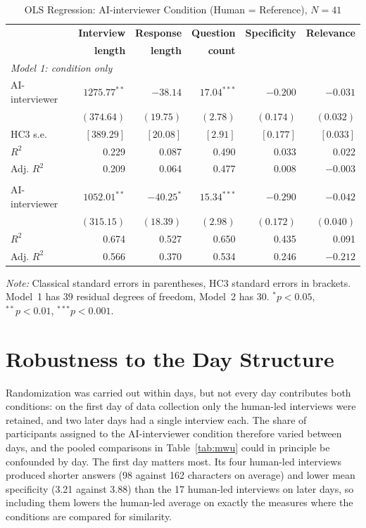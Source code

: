 \documentclass[12pt]{article}
\newcommand{\AII}{AI-interviewer}
\begin{document}
\begin{table}[H]
\centering
\caption{OLS Regression: \AII{} Condition (Human = Reference), $N = 41$}
\label{tab:reg}
\begin{tabularx}{\textwidth}{Xrrrrr}
\toprule
 & \textbf{Interview} & \textbf{Response} & \textbf{Question} &
   \textbf{Specificity} & \textbf{Relevance} \\
 & \textbf{length} & \textbf{length} & \textbf{count} & & \\
\midrule
\multicolumn{6}{l}{\textit{Model 1: condition only}} \\
\quad \AII{} &
  $1275.77^{**}$ & $-38.14$ & $17.04^{***}$ & $-0.200$ & $-0.031$ \\
 & $(374.64)$ & $(19.75)$ & $(2.78)$ & $(0.174)$ & $(0.032)$ \\
\quad HC3 s.e.
 & $[389.29]$ & $[20.08]$ & $[2.91]$ & $[0.177]$ & $[0.033]$ \\
\quad $R^{2}$ & 0.229 & 0.087 & 0.490 & 0.033 & 0.022 \\
\quad Adj. $R^{2}$ & 0.209 & 0.064 & 0.477 & 0.008 & $-0.003$ \\
\addlinespace
\multicolumn{6}{l}{\textit{Model 2: condition and day fixed effects}} \\
\quad \AII{} &
  $1052.01^{**}$ & $-40.25^{*}$ & $15.34^{***}$ & $-0.290$ & $-0.042$ \\
 & $(315.15)$ & $(18.39)$ & $(2.98)$ & $(0.172)$ & $(0.040)$ \\
\quad $R^{2}$ & 0.674 & 0.527 & 0.650 & 0.435 & 0.091 \\
\quad Adj. $R^{2}$ & 0.566 & 0.370 & 0.534 & 0.246 & $-0.212$ \\
\bottomrule
\end{tabularx}
\smallskip
\parbox{\textwidth}{\singlespacing\small \textit{Note:} Classical standard errors in parentheses,
HC3 standard errors in brackets. Model~1 has 39 residual degrees of
freedom, Model~2 has 30. $^{*}p < 0.05$, $^{**}p < 0.01$,
$^{***}p < 0.001$.}
\end{table}

\section{Robustness to the Day Structure}
\label{app:robust}

Randomization was carried out within days, but not every day contributes both conditions: on the first day of data collection only the human-led interviews were retained, and two later days had a single interview each. The share of participants assigned to the \AII{} condition therefore varied between days, and the pooled comparisons in Table~\ref{tab:mwu} could in principle be confounded by day. The first day matters most. Its four human-led interviews produced shorter answers (98 against 162 characters on average) and lower mean specificity (3.21 against 3.88) than the 17 human-led interviews on later days, so including them lowers the human-led average on exactly the measures where the conditions are compared for similarity.
\end{document}
